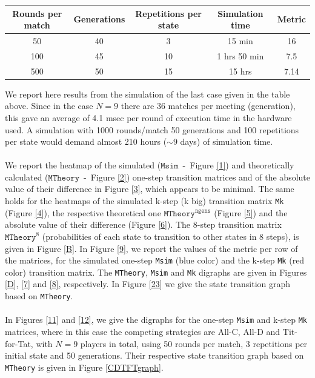 \documentclass[12pt]{report}
\begin{document}
\begin{center}
\begin{tabular}{|c|c|c|c|c|}
 \hline
 Rounds per match & Generations & Repetitions per state & Simulation time & Metric \\ 
 \hline
50 & 40 & 3 & 15 min & 16 \\
 \hline
100 &   45 & 10 & 1 hrs 50 min & 7.5 \\
 \hline
500 & 50 & 15 & 15 hrs & 7.14 \\
 \hline
\end{tabular}
\end{center}
We report here results from the simulation of the last case given in the table above. Since in the case $N=9$ there are 36 matches per meeting (generation), this gave an average of 4.1 msec per round of execution time in the hardware used. A simulation with 1000 rounds/match 50 generations and 100 repetitions per state would demand almost 210 hours ($\sim 9$ days) of simulation time.
\\\\
We report the heatmap of the simulated ($\texttt{Msim}$\ -\ Figure \ref{1}) and theoretically calculated ($\texttt{MTheory}$\ -\ Figure \ref{2}) one-step transition matrices and of the absolute value of their difference in Figure \ref{3}, which appears to be minimal. The same holds for the heatmaps of the simulated k-step (k big) transition matrix \texttt{Mk} (Figure \ref{4}), the respective theoretical one $\texttt{MTheory}^{\texttt{ngens}}$ (Figure \ref{5}) and the absolute value of their difference (Figure \ref{6}). The 8-step transition matrix $\texttt{MTheory}^8$ (probabilities of each state to transition to other states in 8 steps), is given in Figure \ref{B}. In Figure \ref{9}, we report the values of the metric per row of the matrices, for the simulated one-step \texttt{Msim} (blue color) and the k-step \texttt{Mk} (red color) transition matrix. The \texttt{MTheory}, \texttt{Msim} and \texttt{Mk} digraphs are given in Figures \ref{D}, \ref{7} and \ref{8}, respectively. In Figure \ref{23} we give the state transition graph based on \texttt{MTheory}.
\\\\
In Figures \ref{11} and \ref{12}, we give the digraphs for the one-step \texttt{Msim} and k-step \texttt{Mk} matrices, where in this case the competing strategies are All-C, All-D and Tit-for-Tat, with $N=9$ players in total, using 50 rounds per match, 3 repetitions per initial state and 50 generations. Their respective state transition graph based on \texttt{MTheory} is given in Figure \ref{CDTFTgraph}.
\end{document}
